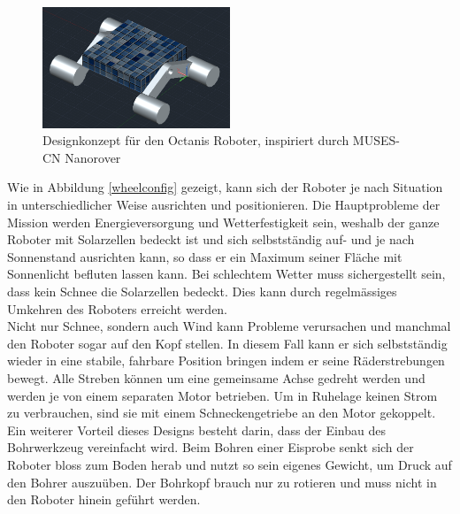 \documentclass[a4paper,12pt]{article}
\begin{document}
\begin{figure}[h!]
	\centering
    \includegraphics[width=0.5\textwidth]{conceptrover}
    \caption{Designkonzept für den Octanis Roboter, inspiriert durch MUSES-CN Nanorover}
	\label{cadmodel}
\end{figure}

Wie in Abbildung \ref{wheelconfig} gezeigt, kann sich der Roboter je nach Situation in unterschiedlicher Weise ausrichten und positionieren. Die Hauptprobleme der Mission werden Energieversorgung und Wetterfestigkeit sein, weshalb der ganze Roboter mit Solarzellen bedeckt ist und sich selbstständig auf- und je nach Sonnenstand ausrichten kann, so dass er ein Maximum seiner Fläche mit Sonnenlicht befluten lassen kann. Bei schlechtem Wetter muss sichergestellt sein, dass kein Schnee die Solarzellen bedeckt. Dies kann durch regelmässiges Umkehren des Roboters erreicht werden. \\
Nicht nur Schnee, sondern auch Wind kann Probleme verursachen und manchmal den Roboter sogar auf den Kopf stellen. In diesem Fall kann er sich selbstständig wieder in eine stabile, fahrbare Position bringen indem er seine Räderstrebungen bewegt. Alle Streben können um eine gemeinsame Achse gedreht werden und werden je von einem separaten Motor betrieben. Um in Ruhelage keinen Strom zu verbrauchen, sind sie mit einem Schneckengetriebe an den Motor gekoppelt. \\
Ein weiterer Vorteil dieses Designs besteht darin, dass der Einbau des Bohrwerkzeug vereinfacht wird. Beim Bohren einer Eisprobe senkt sich der Roboter bloss zum Boden herab und nutzt so sein eigenes Gewicht, um Druck auf den Bohrer auszuüben. Der Bohrkopf brauch nur zu rotieren und muss nicht in den Roboter hinein geführt werden.
\end{document}
